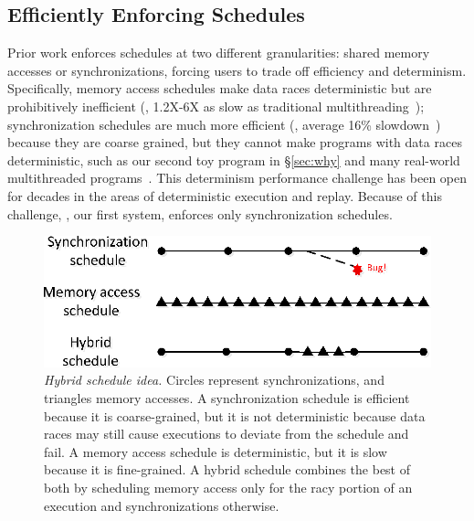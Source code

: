 \subsection{Efficiently Enforcing Schedules} \label{sec:relax}


Prior work enforces schedules at two different granularities: shared
memory accesses or synchronizations, forcing users to trade off efficiency
and determinism.  Specifically, memory access schedules make data races
deterministic but are prohibitively inefficient (\eg, 1.2X-6X as slow as
traditional multithreading~\cite{coredet:asplos10}); synchronization
schedules are much more efficient (\eg, average 16\%
slowdown~\cite{kendo:asplos09}) because they are coarse grained, but they
cannot make programs with data races deterministic, such as our second toy
program in \S\ref{sec:why} and many real-world multithreaded
programs~\cite{lu:concurrency-bugs,syncfinder:osdi10}.  This determinism
\vs performance challenge has been open for decades in the areas of
deterministic execution and replay.  Because of this challenge, 
\tern, our first \smt system, enforces only synchronization schedules.


\begin{figure}[t]
\includegraphics[width=\linewidth]{peregrine/figures/hybrid-schedule}
\vspace{-.3in}
\caption{{\em Hybrid schedule idea.} Circles represent synchronizations,
  and triangles memory accesses.  A synchronization schedule is efficient
  because it is coarse-grained, but it is not deterministic because data
  races may still cause executions to deviate from the schedule and
  fail.  A memory access schedule is
  deterministic, but it is slow because it is fine-grained.  A hybrid
  schedule combines the best of both by scheduling memory access only for
  the racy portion of an execution and synchronizations
  otherwise.} \label{fig:hybrid-schedule}
\end{figure}

